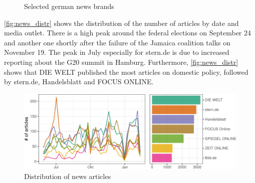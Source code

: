 \documentclass[
  12pt,
]{article}
\begin{document}
\begin{figure}

{\centering {}

}

\caption{Selected german news brands \label{fig:news_market}}\label{fig:unnamed-chunk-1}
\end{figure}

\autoref{fig:news_distr} shows the distribution of the number of
articles by date and media outlet. There is a high peak around the
federal elections on September 24 and another one shortly after the
failure of the Jamaica coalition talks on November 19. The peak in July
especially for stern.de is due to increased reporting about the G20
summit in Hamburg. Furthermore, \autoref{fig:news_distr} shows that DIE
WELT published the most articles on domestic policy, followed by
stern.de, Handelsblatt and FOCUS ONLINE.

\begin{figure}

{\centering \includegraphics[width=0.8\linewidth]{chap1_files/figure-latex/Distribution of news articles-1} 

}

\caption{Distribution of news articles \label{fig:news_distr}}\label{fig:Distribution of news articles}
\end{figure}
\end{document}
